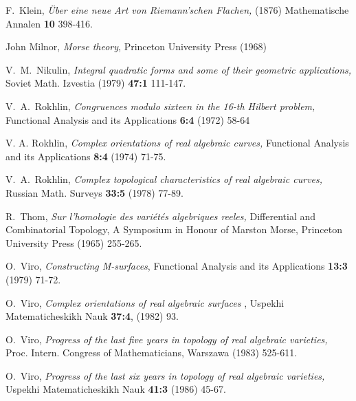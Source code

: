 \documentclass{article}
\numberwithin{equation}{section}
\begin{document}
\begin{thebibliography}{999}
F.~Klein,
{\it  \"{U}ber eine neue Art von Riemann'schen Flachen,\/}
(1876) Mathematische Annalen
{\bf 10} 398-416.

John Milnor,
{\it Morse theory\/},
Princeton University Press
(1968)

V.~M.~Nikulin,
{\it  Integral quadratic forms and some of their geometric applications,\/}
 Soviet Math. Izvestia
(1979) {\bf 47:1}
111-147.

V.~A.~Rokhlin,
{\it  Congruences modulo sixteen in the 16-th Hilbert problem,\/} 
Functional Analysis and its Applications
{\bf 6:4}
(1972) 58-64

V. A. Rokhlin,
{\it  Complex orientations of real algebraic curves,\/} 
Functional Analysis and its Applications
{\bf 8:4}
(1974) 71-75.

V.~A.~Rokhlin,
{\it  Complex topological characteristics of real
algebraic curves,\/} Russian Math. Surveys
{\bf 33:5}
(1978) 77-89.

R.~Thom,
{\it  Sur l'homologie des vari\'{e}t\'{e}s algebriques reeles,\/}
Differential and Combinatorial Topology, A Symposium in Honour
of Marston Morse,
 Princeton University Press (1965) 255-265.

O.~Viro,
{\it  Constructing M-surfaces\/},  Functional Analysis and its Applications
{\bf 13:3}
(1979) 71-72.

O.~Viro,
{\it  Complex orientations of real algebraic surfaces
\/}, Uspekhi Matematicheskikh Nauk
{\bf 37:4}, 
(1982) 93.

O.~Viro,
{\it  Progress of the last five years in topology of real algebraic
varieties,\/}
 Proc. Intern. Congress of Mathematicians, Warszawa
(1983) 525-611.

O.~Viro,
{\it  Progress of the last six years in topology of real algebraic
varieties,\/} Uspekhi Matematicheskikh Nauk
{\bf41:3} 
(1986) 45-67.


\end{thebibliography}
\end{document}
